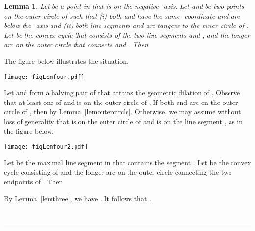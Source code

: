 \documentclass[12pt]{article}
\newtheorem{lemma}{Lemma}
\newcommand{\qed}{\rule{0.5em}{1.5ex}}
\newcommand{\fqed}{{\hfill~\qed}}
\newenvironment{proof}{{\noindent \bf Proof.}}
                      {{\hfill \fqed} \vspace{1em}}
\begin{document}
\begin{lemma}   \label{lemfour}  
Let  be a point in  that is on the negative -axis. 
Let  and  be two points on the outer circle of  
such that (i) both  and  have the same -coordinate and are
below the -axis and (ii) both line segments  and  are 
tangent to the inner circle of . 
Let  be the convex cycle that consists of the two line segments 
and , and the longer arc on the outer circle that connects  
and . Then 
  
\end{lemma} 
\begin{proof}  
The figure below illustrates the situation. 

\begin{center}
   \texttt{[image: figLemfour.pdf]}
\end{center}

Let  and  form a halving pair of  that attains the geometric 
dilation of . Observe that at least one of  and  is on the 
outer circle of . If both  and  are on the outer 
circle of , then  by 
Lemma~\ref{lemoutercircle}. Otherwise, we may assume without loss of 
generality that  is on the outer circle of  and  is 
on the line segment , as in the figure below. 

\begin{center}
   \texttt{[image: figLemfour2.pdf]}
\end{center}

Let  be the maximal line segment in  that contains the 
segment . Let  be the convex cycle consisting of  and the 
longer arc on the outer circle connecting the two endpoints of . Then 
 
By Lemma~\ref{lemthree}, we have . 
It follows that . 
\end{proof}  
\end{document}
